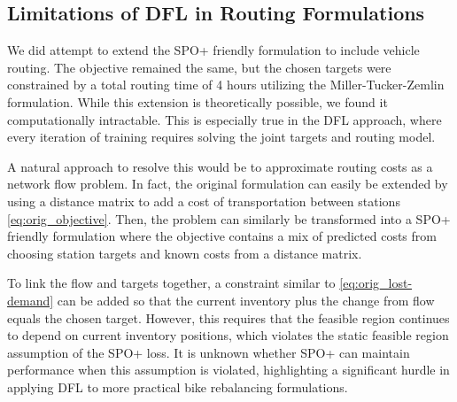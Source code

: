 \documentclass{article}
\begin{document}
\subsection{Limitations of DFL in Routing Formulations}
We did attempt to extend the SPO+ friendly formulation to include vehicle routing. The objective remained the same, but the chosen targets were constrained by a total routing time of 4 hours utilizing the Miller-Tucker-Zemlin formulation. While this extension is theoretically possible, we found it computationally intractable. This is especially true in the DFL approach, where every iteration of training requires solving 
the joint targets and routing model. 

A natural approach to resolve this would be to approximate routing costs as a network flow problem. In fact, the original formulation can easily be extended by using a distance matrix to add a cost of transportation between stations \cref{eq:orig_objective}. Then, the problem can similarly be transformed into a SPO+ friendly formulation where the objective contains a mix of predicted costs from choosing station targets and known costs from a distance matrix. 

To link the flow and targets together, a constraint similar to \cref{eq:orig_lost-demand} can be added so that the current inventory plus the change from flow equals the chosen target. However, this requires that the feasible region continues to depend on current inventory positions, which violates the static feasible region assumption of the SPO+ loss. It is unknown whether SPO+ can maintain performance when this assumption is violated, highlighting a significant hurdle in applying DFL to more practical bike rebalancing formulations.
\end{document}
